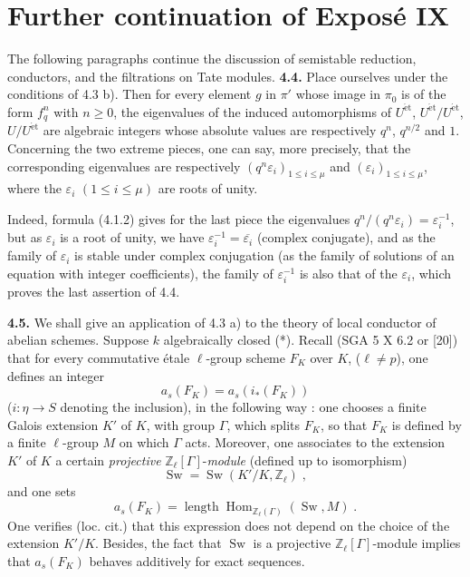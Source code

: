 \documentclass[11pt]{article}
\newcommand{\Hom}{\operatorname{Hom}}
\newcommand{\ZZ}{\mathbb Z}
\newcommand{\longueur}{\operatorname{length}}
\newcommand{\et}{\mathrm{\acute{e}t}}
\begin{document}
\clearpage
\section*{Further continuation of Exposé IX}

The following paragraphs continue the discussion of semistable reduction,
conductors, and the filtrations on Tate modules.
\noindent\textbf{4.4.} Place ourselves under the conditions of 4.3 b).
Then for every element $g$ in $\pi'$ whose image in $\pi_0$ is of the
form $f_q^n$ with $n \geq 0$, the eigenvalues of the induced automorphisms
of $U^{\et}$, $U^{\et}/U^{\et}$, $U/U^{\et}$ are algebraic integers whose
absolute values are respectively $q^n$, $q^{n/2}$ and $1$. Concerning the
two extreme pieces, one can say, more precisely, that the corresponding
eigenvalues are respectively $(q^n \varepsilon_i)_{1 \leq i \leq \mu}$ and
$(\varepsilon_i)_{1 \leq i \leq \mu}$, where the $\varepsilon_i$
$(1 \leq i \leq \mu)$ are roots of unity.

Indeed, formula (4.1.2) gives for the last piece the eigenvalues
$q^n/(q^n \varepsilon_i) = \varepsilon_i^{-1}$, but as $\varepsilon_i$
is a root of unity, we have $\varepsilon_i^{-1} = \overline{\varepsilon_i}$
(complex conjugate), and as the family of $\varepsilon_i$ is stable under
complex conjugation (as the family of solutions of an equation with
integer coefficients), the family of $\varepsilon_i^{-1}$ is also that of
the $\varepsilon_i$, which proves the last assertion of 4.4.


\medskip

\noindent\textbf{4.5.} We shall give an application of 4.3 a) to the theory
of local conductor of abelian schemes. Suppose $k$ algebraically closed
(*). Recall (SGA 5 X 6.2 or [20]) that for every commutative \'etale
$\ell$-group scheme $F_K$ over $K$, ($\ell \neq p$), one defines an
integer
\begin{equation}
a_s(F_K) = a_s(i_*(F_K))
\end{equation}
($i \colon \eta \to S$ denoting the inclusion), in the following way : one
chooses a finite Galois extension $K'$ of $K$, with group $\Gamma$, which
splits $F_K$, so that $F_K$ is defined by a finite $\ell$-group $M$ on
which $\Gamma$ acts. Moreover, one associates to the extension $K'$ of
$K$ a certain \emph{projective} $\ZZ_{\ell}[\Gamma]$-\emph{module}
(defined up to isomorphism)
\begin{equation}
\operatorname{Sw} = \operatorname{Sw}(K'/K, \ZZ_{\ell}) \; ,
\end{equation}
and one sets
\begin{equation}
a_s(F_K) = \longueur \Hom_{\ZZ_{\ell}(\Gamma)}(\operatorname{Sw}, M) \; .
\end{equation}
One verifies (loc. cit.) that this expression does not depend on the
choice of the extension $K'/K$. Besides, the fact that
$\operatorname{Sw}$ is a projective $\ZZ_{\ell}[\Gamma]$-module implies
that $a_s(F_K)$ behaves additively for exact sequences.
\end{document}
